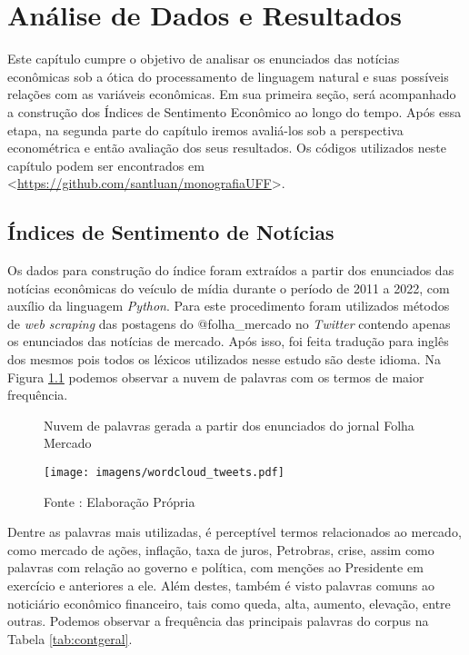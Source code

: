 \chapter{Análise de Dados e Resultados}

Este capítulo cumpre o objetivo de analisar os enunciados das notícias econômicas sob a ótica do processamento de linguagem natural e suas possíveis relações com as variáveis econômicas. Em sua primeira seção, será acompanhado a construção dos Índices de Sentimento Econômico ao longo do tempo. Após essa etapa, na segunda parte do capítulo iremos avaliá-los sob a perspectiva econométrica e então avaliação dos seus resultados. Os códigos utilizados neste capítulo podem ser encontrados em <\url{https://github.com/santluan/monografiaUFF}>.

\section{Índices de Sentimento de Notícias}

Os dados para construção do índice foram extraídos a partir dos enunciados das notícias econômicas do veículo de mídia \cite{folha-mercado} durante o período de 2011 a 2022, com auxílio da linguagem \textit{Python}. Para este procedimento foram utilizados métodos de \textit{web scraping} das postagens do @folha\_mercado no \textit{Twitter} contendo apenas os enunciados das notícias de mercado. Após isso, foi feita tradução para inglês dos mesmos pois todos os léxicos utilizados nesse estudo são deste idioma. Na Figura \ref{fig: wordcloud} podemos observar a nuvem de palavras com os termos de maior frequência. 

\begin{figure}[htp!]
\centering
\caption{Nuvem de palavras gerada a partir dos enunciados do jornal Folha Mercado}
\label{fig: wordcloud}
\texttt{[image: imagens/wordcloud\_tweets.pdf]}
\caption*{Fonte : Elaboração Própria}
\end{figure}

Dentre as palavras mais utilizadas, é perceptível termos relacionados ao mercado, como mercado de ações, inflação, taxa de juros, Petrobras, crise, assim como palavras com relação ao governo e política, com menções ao Presidente em exercício e anteriores a ele. Além destes, também é visto palavras comuns ao noticiário econômico financeiro, tais como queda, alta, aumento, elevação, entre outras. Podemos observar a frequência das principais palavras do corpus na Tabela \ref{tab:contgeral}.

